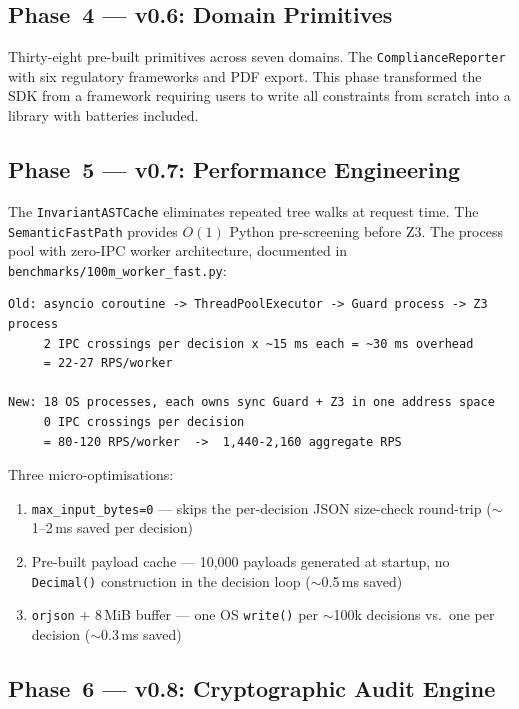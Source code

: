 \documentclass[12pt,a4paper,oneside]{report}
\newcommand{\fname}[1]{\texttt{#1}}          %
\newcommand{\code}[1]{\texttt{#1}}           %
\begin{document}
\subsection{Phase~4 --- v0.6: Domain Primitives}

Thirty-eight pre-built primitives across seven domains. The
\code{ComplianceReporter} with six regulatory frameworks and PDF export. This
phase transformed the SDK from a framework requiring users to write all
constraints from scratch into a library with batteries included.

\subsection{Phase~5 --- v0.7: Performance Engineering}

The \code{InvariantASTCache} eliminates repeated tree walks at request time.
The \code{SemanticFastPath} provides $O(1)$ Python pre-screening before Z3.
The process pool with zero-IPC worker architecture, documented in
\fname{benchmarks/100m\_worker\_fast.py}:

\begin{lstlisting}[style=plain,caption={IPC architecture comparison (source:
  \fname{benchmarks/100m\_worker\_fast.py})}]
Old: asyncio coroutine -> ThreadPoolExecutor -> Guard process -> Z3 process
     2 IPC crossings per decision x ~15 ms each = ~30 ms overhead
     = 22-27 RPS/worker

New: 18 OS processes, each owns sync Guard + Z3 in one address space
     0 IPC crossings per decision
     = 80-120 RPS/worker  ->  1,440-2,160 aggregate RPS
\end{lstlisting}

Three micro-optimisations:
\begin{enumerate}
  \item \code{max\_input\_bytes=0} --- skips the per-decision JSON size-check
        round-trip ($\sim$1--2\,ms saved per decision)
  \item Pre-built payload cache --- 10,000 payloads generated at startup,
        no \code{Decimal()} construction in the decision loop ($\sim$0.5\,ms
        saved)
  \item \code{orjson} $+$ 8\,MiB buffer --- one OS \code{write()} per
        $\sim$100k decisions vs.\ one per decision ($\sim$0.3\,ms saved)
\end{enumerate}

\subsection{Phase~6 --- v0.8: Cryptographic Audit Engine}
\end{document}
